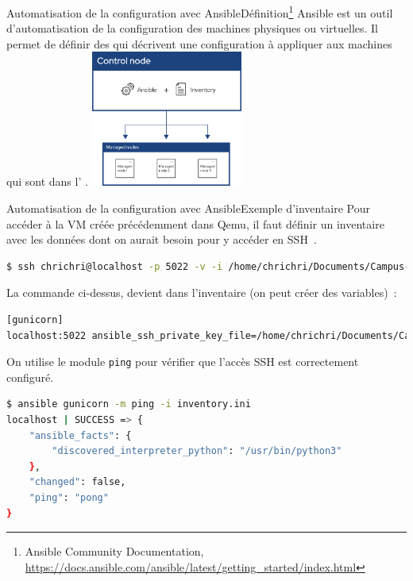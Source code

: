 \documentclass{beamer}
\begin{document}
    \begin{frame}{Automatisation de la configuration avec Ansible}{Définition\footnote{Ansible Community Documentation, \url{https://docs.ansible.com/ansible/latest/getting_started/index.html}}}
        Ansible est un outil d'automatisation de la configuration des machines physiques ou virtuelles.
        Il permet de définir des  qui décrivent une configuration à appliquer aux machines qui sont dans l' .
        \bigbreak
        \centering
        \includegraphics[width=5cm]{image/ansible}
    \end{frame}

    \begin{frame}[fragile]{Automatisation de la configuration avec Ansible}{Exemple d'inventaire}
        Pour accéder à la VM créée précédemment dans Qemu, il faut définir un inventaire avec les données dont on aurait besoin pour y accéder en SSH~.
        \begin{lstlisting}[language=bash,basicstyle=\ttfamily\tiny]
$ ssh chrichri@localhost -p 5022 -v -i /home/chrichri/Documents/Campus-St-Michel-IT/production-deployment/virt-ubuntu
        \end{lstlisting}
        La commande ci-dessus, devient dans l'inventaire (on peut créer des variables)~:
        \begin{lstlisting}[language=bash,basicstyle=\ttfamily\tiny]
[gunicorn]
localhost:5022 ansible_ssh_private_key_file=/home/chrichri/Documents/Campus-St-Michel-IT/production-deployment/virt-ubuntu ansible_ssh_user=chrichri
        \end{lstlisting}
        On utilise le module \lstinline{ping} pour vérifier que l'accès SSH est correctement configuré.
        \begin{lstlisting}[language=bash,basicstyle=\ttfamily\tiny]
$ ansible gunicorn -m ping -i inventory.ini
localhost | SUCCESS => {
    "ansible_facts": {
        "discovered_interpreter_python": "/usr/bin/python3"
    },
    "changed": false,
    "ping": "pong"
}
        \end{lstlisting}
    \end{frame}
\end{document}
